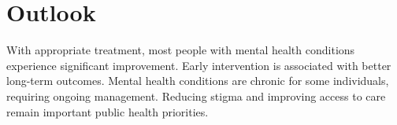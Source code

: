 \section{Outlook}
With appropriate treatment, most people with mental health conditions experience significant improvement. Early intervention is associated with better long-term outcomes. Mental health conditions are chronic for some individuals, requiring ongoing management. Reducing stigma and improving access to care remain important public health priorities.
